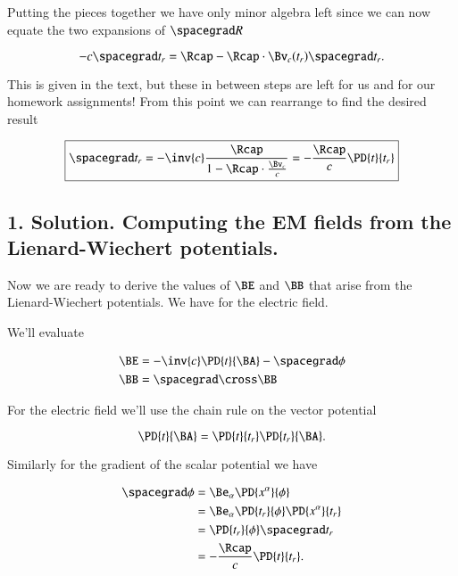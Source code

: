 Putting the pieces together we have only minor algebra left since we can now equate the two expansions of $\spacegrad R$

\begin{equation}\label{eqn:relElectroDynProblemSet5:360}
- c \spacegrad t_r = \Rcap - \Rcap \cdot \Bv_c(t_r) \spacegrad t_r.
\end{equation}

This is given in the text, but these in between steps are left for us and for our homework assignments!  From this point we can rearrange to find the desired result

\begin{equation}\label{eqn:relElectroDynProblemSet5:380}
\boxed{
\spacegrad t_r = -\inv{c} \frac{\Rcap }{ 1 - \Rcap \cdot \frac{\Bv_c}{c} } = - \frac{\Rcap}{c} \PD{t}{t_r}
}
\end{equation}

\subsection{1. Solution.  Computing the EM fields from the Lienard-Wiechert potentials.}

Now we are ready to derive the values of $\BE$ and $\BB$ that arise from the Lienard-Wiechert potentials.  We have for the electric field.

We'll evaluate 

\begin{align*}
\BE &= -\inv{c} \PD{t}{\BA} - \spacegrad \phi \\
\BB &= \spacegrad \cross \BB
\end{align*}

For the electric field we'll use the chain rule on the vector potential

\begin{equation}\label{eqn:relElectroDynProblemSet5:400}
\PD{t}{\BA} = \PD{t}{t_r} \PD{t_r}{\BA}.
\end{equation}

Similarly for the gradient of the scalar potential we have

\begin{align*}
\spacegrad \phi 
&=
\Be_\alpha \PD{x^\alpha}{\phi} \\
&=
\Be_\alpha \PD{t_r}{\phi} \PD{x^\alpha}{t_r} \\
&=
\PD{t_r}{\phi} \spacegrad t_r \\
&=
- \frac{\Rcap}{c} \PD{t}{t_r}.
\end{align*}

